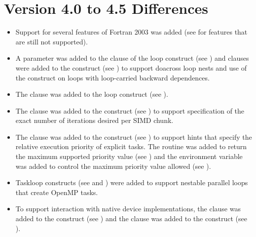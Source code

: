 \section{Version 4.0 to 4.5 Differences}
\label{sec:Version 4.0 to 4.5 Differences}
\begin{itemize}
\item Support for several features of Fortran 2003 was added (see 
       for features that are still 
      not supported).

\item A parameter was added to the  clause of the loop construct 
      (see ) and clauses were added to the 
       construct (see ) to 
      support doacross loop nests and use of the  construct on 
      loops with loop-carried backward dependences. 

\item The  clause was added to the loop construct 
      (see ).

\item The  clause was added to the  construct
      (see ) to support specification of 
      the exact number of iterations desired per SIMD chunk. 

\item The  clause was added to the  construct
      (see ) to support hints that specify
      the relative execution priority of explicit tasks. The 
       routine was added to return
      the maximum supported priority value (see 
      ) and the 
       environment variable was added to
      control the maximum priority value allowed (see 
      ).

\item Taskloop constructs (see  and 
      ) were added to support 
      nestable parallel loops that create OpenMP tasks. 

\item To support interaction with native device implementations, the 
       clause was added to the 
      construct (see ) and the 
       clause was added to the  construct
      (see ).


\end{itemize}
